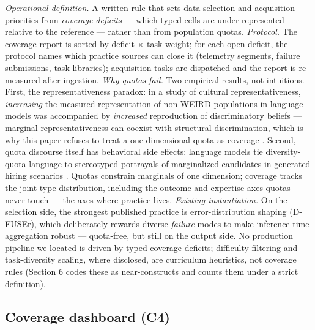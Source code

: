 \documentclass[10pt]{article}
\begin{document}
\emph{Operational definition.} A written rule that sets data-selection and acquisition priorities from \emph{coverage deficits} --- which typed cells are under-represented relative to the reference --- rather than from population quotas. \emph{Protocol.} The coverage report is sorted by deficit $\times$ task weight; for each open deficit, the protocol names which practice sources can close it (telemetry segments, failure submissions, task libraries); acquisition tasks are dispatched and the report is re-measured after ingestion. \emph{Why quotas fail.} Two empirical results, not intuitions. First, the representativeness paradox: in a study of cultural representativeness, \emph{increasing} the measured representation of non-WEIRD populations in language models was accompanied by \emph{increased} reproduction of discriminatory beliefs --- marginal representativeness can coexist with structural discrimination, which is why this paper refuses to treat a one-dimensional quota as coverage \cite{ref14}. Second, quota discourse itself has behavioral side effects: language models tie diversity-quota language to stereotyped portrayals of marginalized candidates in generated hiring scenarios \cite{ref15}. Quotas constrain marginals of one dimension; coverage tracks the joint type distribution, including the outcome and expertise axes quotas never touch --- the axes where practice lives. \emph{Existing instantiation.} On the selection side, the strongest published practice is error-distribution shaping (D-FUSEr), which deliberately rewards diverse \emph{failure} modes to make inference-time aggregation robust \cite{ref16} --- quota-free, but still on the output side. No production pipeline we located is driven by typed coverage deficits; difficulty-filtering and task-diversity scaling, where disclosed, are curriculum heuristics, not coverage rules (Section 6 codes these as near-constructs and counts them under a strict definition).

\subsection{Coverage dashboard (C4)}
\end{document}
